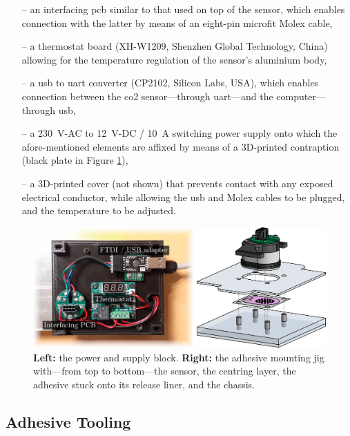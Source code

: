 \begin{enumerate}
	\item[--] an interfacing \gls{pcb} similar to that used on top of the sensor, which enables connection with the latter by means of an eight-pin microfit Molex cable,
	\item[--] a thermostat board (XH-W1209, Shenzhen Global Technology, China) allowing for the temperature regulation of the sensor's aluminium body,%
	\item[--] a \gls{usb} to \gls{uart} converter (CP2102, Silicon Labs, USA), which enables connection between the \gls{co2} sensor---through \gls{uart}---and the computer---through \gls{usb},
	\item[--] a 230~V-AC to 12~V-DC / 10~A switching power supply onto which the afore-mentioned elements are affixed by means of a 3D-printed contraption (black plate in Figure \ref{annfig:photo_jig}),
	\item[--] a 3D-printed cover (not shown) that prevents contact with any exposed electrical conductor, while allowing the \gls{usb} and Molex cables to be plugged, and the temperature to be adjusted.
\end{enumerate}

\begin{figure}
	\centering
	\includegraphics[width=\linewidth]{2_appendices/figures/photo_jig_comp}
	\caption[Power and supply block and adhesive mounting jig.]{\textbf{Left:} the power and supply block. \textbf{Right:} the adhesive mounting jig with---from top to bottom---the sensor, the centring layer, the adhesive stuck onto its release liner, and the chassis.}\label{annfig:photo_jig}
\end{figure}

\subsection{Adhesive Tooling}

